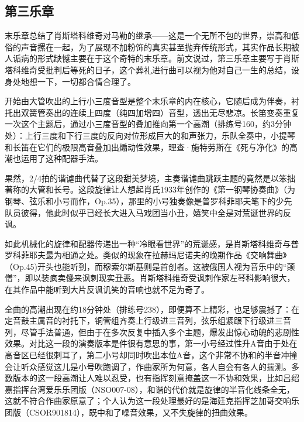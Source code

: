 \documentclass[a4paper,left=2.5cm,right=2.5cm,11pt]{article}
\begin{document}
\subsection{第三乐章}
	末乐章总结了肖斯塔科维奇对马勒的继承——这是一个无所不包的世界，崇高和低俗的声音摞在一起，为了展现不加粉饰的真实甚至抛弃传统形式，其实作品长期被人诟病的形式缺憾主要在于这个奇特的末乐章。前文说过，第三乐章主要写于肖斯塔科维奇受批判后等死的日子，这个葬礼进行曲可以视为他对自己一生的总结，设身处地想一下，一切都合情合理了。\par

	开始由大管吹出的上行小三度音型是整个末乐章的内在核心，它随后成为伴奏，衬托出双簧管奏出的连续上四度（纯四加增四）音型，透出无尽悲凉。长笛变奏重复一次这个主题后，通过小三度音型的叠加推向第一个高潮（排练号160，约3分钟处）：上行三度和下行三度的反向对位形成巨大的和声张力，乐队全奏中，小提琴和长笛在它们的极限高音叠加出煽动性效果，理查·施特劳斯在《死与净化》的高潮也运用了这种配器手法。\par

	果然，2/4拍的谐谑曲代替了这段甜美梦境，主奏谐谑曲跳跃主题的竟然是以笨拙著称的大管和长号。这段旋律让人想起肖氏1933年创作的《第一钢琴协奏曲》（为钢琴、弦乐和小号而作，Op.35），那里的小号独奏像是普罗科菲耶夫笔下的少先队员彼得，他此时似乎已经长大进入马戏团当小丑，嬉笑中全是对荒诞世界的反讽。\par

	如此机械化的旋律和配器传递出一种“冷眼看世界”的荒诞感，是肖斯塔科维奇与普罗科菲耶夫最为相通之处。类似的现象在拉赫玛尼诺夫的晚期作品《交响舞曲》（Op.45)开头也能听到，而穆索尔斯基则是首创者。这被俄国人视为音乐中的“颠僧”，即以装疯卖傻来讽刺现实丑恶。肖斯塔科维奇受讽刺作家左琴科影响很大，在其作品中能听到大片反讽讥笑的音响也就不足为奇了。\par

	全曲的高潮出现在约18分钟处（排练号238），即便算不上精彩，也足够震撼了：在定音鼓主属音的衬托下，铜管组齐奏上行级进三音列，弦乐组紧跟下行级进三音列，尽管手法普通，但由于在多次反复中插入多个主题，爆发出惊心动魄的悲剧性效果。对比这一段的演奏版本是件很有意思的事，第一小号经过性升A音由于处在高音区已经很刺耳了，第二小号却同时吹出本位A音，这个非常不协和的半音冲撞会让听众感觉这儿是小号吹跑调了，作曲家所为何意，各人自会有各人的揣测。多数版本的这一段高潮让人难以忍受，也有指挥刻意掩盖这一不协和效果，比如吕绍嘉指挥台湾爱乐乐团版（NSO007-08），和谐的代价就是旋律的半音化线条全无，这就不符合作曲家原意了；个人认为这一段处理最好的是海廷克指挥芝加哥交响乐团版（CSOR901814），既中和了噪音效果，又不失旋律的扭曲效果。\par
\end{document}
